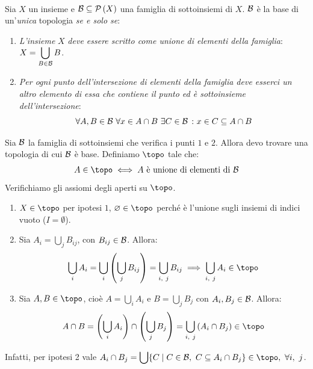 \begin{theorema}~{}\label{teoremabasi}\\
Sia $X$ un insieme e $\mathcal{B}\subseteq\mathcal{P}\left(X\right)$ una famiglia di sottoinsiemi di $X$. $\mathcal{B}$ è la base di un'\textit{unica} topologia \textit{se e solo se}:
\begin{enumerate}
\item \textit{L'insieme} $X$ \textit{deve essere scritto come unione di elementi della famiglia}: $\displaystyle X=\bigcup_{B\in \mathcal{B}}B$.
\item \textit{Per ogni punto dell'intersezione di elementi della famiglia deve esserci un altro elemento di essa che contiene il punto ed è sottoinsieme dell'intersezione}:
\begin{equation}
	\forall A, B\in\basis\ \forall x\in A\cap B\ \exists C\in \basis\ \colon x\in C\subseteq A\cap B
\end{equation}
\end{enumerate}
\vspace{-6mm}
\end{theorema}
\begin{demonstration}
Sia $\mathcal{B}$ la famiglia di sottoinsiemi che verifica i punti $1$ e $2$. Allora devo trovare una topologia di cui $\mathcal{B}$ è base. Definiamo $\topo$ tale che:
\begin{equation*}
A\in\topo\iff A\text{ è unione di elementi di }\basis
\end{equation*}
Verifichiamo gli assiomi degli aperti su $\topo$.
\begin{enumerate}[label=\Roman*]
\item $X\in\topo$ per ipotesi $1$, $\emptyset\in\topo$ perché è l'unione sugli insiemi di indici vuoto ($I=\emptyset$).
\item Sia $\displaystyle A_i=\bigcup_{j}B_{ij}$, con $B_{ij}\in\mathcal{B}$. Allora:
\vspace{-3mm}
\begin{equation*}
\bigcup_{i}A_i=\bigcup_{i}\left(\bigcup_{j}B_{ij}\right)=\bigcup_{i,\ j}B_{ij}\implies\bigcup_{i,\ j}A_i\in\topo
\end{equation*}
\item Sia $A, B\in\topo$, cioè $\displaystyle A=\bigcup_{i}A_i$ e $\displaystyle B=\bigcup_{j}B_j$ con $A_i, B_j\in\mathcal{B}$. Allora:
\begin{equation*}
A\cap B=\left(\bigcup_{i}A_i\right)\cap\left(\bigcup_{j}B_j\right)=\bigcup_{i,\ j}\left(A_i\cap B_j\right)\in\topo 
\end{equation*}
\end{enumerate}
Infatti, per ipotesi 2 vale $\displaystyle A_i\cap B_j=\bigcup\{C\mid C\in\basis,\ C\subseteq A_i\cap B_j\}\in \topo,\ \forall i,\ j$.
\end{demonstration}
